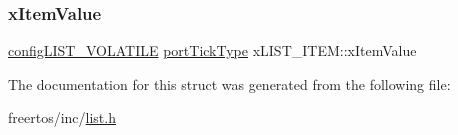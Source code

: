 \mbox{\label{structx_l_i_s_t___i_t_e_m_acdfef3a9fbae98cef8adc272850ef31c}} 
\subsubsection{\texorpdfstring{x\+Item\+Value}{xItemValue}}
{\footnotesize\ttfamily \mbox{\hyperlink{list_8h_a2d5de557c5561c8980d1bf51d87d8cba}{config\+L\+I\+S\+T\+\_\+\+V\+O\+L\+A\+T\+I\+LE}} \mbox{\hyperlink{portmacro_8h_a4d746b2ff8fafc490b764c66411ec457}{port\+Tick\+Type}} x\+L\+I\+S\+T\+\_\+\+I\+T\+E\+M\+::x\+Item\+Value}



The documentation for this struct was generated from the following file\+:\begin{DoxyCompactItemize}
\item 
freertos/inc/\mbox{\hyperlink{list_8h}{list.\+h}}\end{DoxyCompactItemize}
